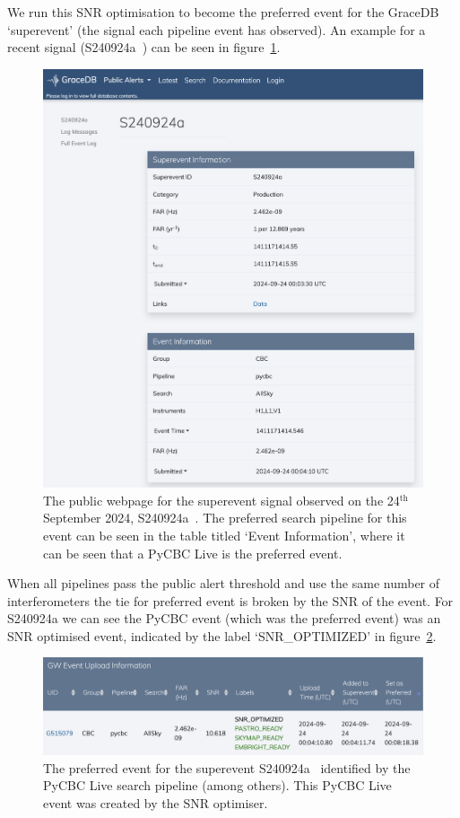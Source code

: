 We run this SNR optimisation to become the preferred event for the GraceDB `superevent' (the \gwadj signal each pipeline event has observed). An example for a recent \gwadj signal (S240924a~\cite{superevent_S240924a}) can be seen in figure~\ref{7:fig:gracedb_pref_event}.
%
\begin{figure}
    \centering
    \includegraphics[width=1.0\linewidth]{images/7_snr_optimiser/gracedb_public_snr_optimiser.png}
    \caption{The public webpage for the superevent \gwadj signal observed on the 24$^{\text{th}}$ September 2024, S240924a~\cite{superevent_S240924a}. The preferred search pipeline for this event can be seen in the table titled `Event Information', where it can be seen that a PyCBC Live is the preferred event.}
    \label{7:fig:gracedb_pref_event}
\end{figure}
%
When all pipelines pass the public alert threshold and use the same number of interferometers the tie for preferred event is broken by the SNR of the event. For S240924a we can see the PyCBC event (which was the preferred event) was an SNR optimised event, indicated by the label `SNR\_OPTIMIZED' in figure~\ref{7:fig:gracedb_snr_optimizer}.
%
\begin{figure}
    \centering
    \includegraphics[width=1.0\linewidth]{images/7_snr_optimiser/gracedb_pycbc_pref_event.png}
    \caption{The preferred event for the superevent S240924a~\cite{superevent_S240924a} identified by the PyCBC Live search pipeline (among others). This PyCBC Live event was created by the SNR optimiser.}
    \label{7:fig:gracedb_snr_optimizer}
\end{figure}
%

